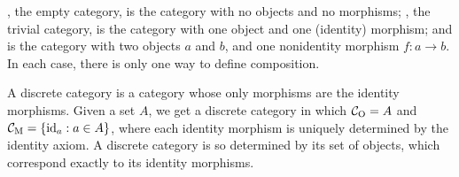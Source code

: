 \begin{example}



  \label{ex:trivial-categories}

  , the empty category, is the category with no objects and
  no morphisms; , the trivial category, is the category with
  one object and one (identity) morphism; and  is the
  category with two objects $a$ and $b$, and one nonidentity morphism
  $f: a \to b$. In each case, there is only one way to define
  composition.


\end{example}

\begin{example}



  \label{ex:discrete-category}


  A discrete category is a category whose only morphisms are the
  identity morphisms. Given a set $A$, we get a discrete category
   in which $\mathcal{C}_{\operatorname{O}} = A$ and $\mathcal{C}_{\operatorname{M}} = \{\operatorname{id}_{a}: a \in
  A\}$, where each identity morphism is uniquely determined by the
  identity axiom. A discrete category is so determined by its set of
  objects, which correspond exactly to its identity morphisms.

\end{example}

